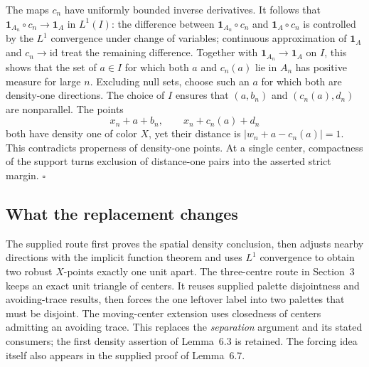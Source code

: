 \documentclass[11pt]{article}
\theoremstyle{definition}
\theoremstyle{remark}
\begin{document}
The maps $c_n$ have uniformly bounded inverse derivatives. It follows that
$\mathbf{1}_{A_n}\circ c_n\to\mathbf{1}_A$ in $L^1(I)$: the difference between
$\mathbf{1}_{A_n}\circ c_n$ and $\mathbf{1}_A\circ c_n$ is controlled by the
$L^1$ convergence under change of variables; continuous approximation of
$\mathbf{1}_A$ and $c_n\to\mathrm{id}$ treat the remaining difference. Together
with $\mathbf{1}_{A_n}\to\mathbf{1}_A$ on $I$, this shows that the set of
$a\in I$ for which both $a$ and $c_n(a)$ lie in $A_n$ has positive measure for
large $n$. Excluding null sets, choose such an $a$ for which both are density-one
directions. The choice of $I$ ensures that $(a,b_n)$ and $(c_n(a),d_n)$ are
nonparallel. The points
\[
x_n+a+b_n,\qquad x_n+c_n(a)+d_n
\]
both have density one of color $X$, yet their distance is
$|w_n+a-c_n(a)|=1$. This contradicts properness of density-one points. At a
single center, compactness of the support turns exclusion of distance-one pairs
into the asserted strict margin. \hfill$\square$

\subsection*{What the replacement changes}
The supplied route first proves the spatial density conclusion, then adjusts
nearby directions with the implicit function theorem and uses $L^1$ convergence
to obtain two robust $X$-points exactly one unit apart. The three-centre route
in Section~3 keeps an exact unit triangle of centers. It reuses supplied palette
disjointness and avoiding-trace results, then forces the one leftover label
into two palettes that must be disjoint. The moving-center extension uses
closedness of centers admitting an avoiding trace. This replaces the
\emph{separation} argument and its stated consumers; the first density assertion
of Lemma~6.3 is retained. The forcing idea itself also appears in the supplied
proof of Lemma~6.7.
\end{document}
